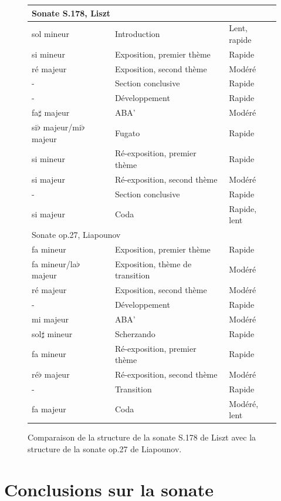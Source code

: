 \begin{figure}[!ht]
  \begin{bigcenter}
    \scalebox{0.875} {
\begin{tabular}{|l|l|l|}
 \hline
\multicolumn{3}{|l|}{Sonate S.178, Liszt}\\
 \hline
sol mineur & Introduction & Lent, rapide\\
si mineur & Exposition, premier thème & Rapide\\
ré majeur & Exposition, second thème & Modéré\\
- & Section conclusive & Rapide\\
- & Développement & Rapide\\
fa$\sharp$ majeur & ABA' & Modéré\\
si$\flat$ majeur/mi$\flat$ majeur & Fugato & Rapide\\
si mineur & Ré-exposition, premier thème & Rapide\\
si majeur & Ré-exposition, second thème & Modéré\\
- & Section conclusive & Rapide\\
si majeur & Coda & Rapide, lent\\
 \hline
 \hline
\multicolumn{3}{|l|}{Sonate op.27, Liapounov}\\
 \hline
fa mineur & Exposition, premier thème & Rapide\\
fa mineur/la$\flat$ majeur & Exposition, thème de transition & Modéré\\
ré majeur & Exposition, second thème & Modéré \\
- & Développement & Rapide\\
mi majeur & ABA' & Modéré\\
sol$\sharp$ mineur & Scherzando & Rapide\\
fa mineur & Ré-exposition, premier thème & Rapide\\
ré$\flat$ majeur & Ré-exposition, second thème & Modéré\\
- & Transition & Rapide\\
fa majeur & Coda & Modéré, lent\\
 \hline
\end{tabular}
    }
  \end{bigcenter}
  \caption{\label{sonate-liapounov-list2}Comparaison de la structure de la sonate S.178 de Liszt avec la structure de la sonate op.27 de Liapounov.}
\end{figure}

\section{Conclusions sur la sonate}


